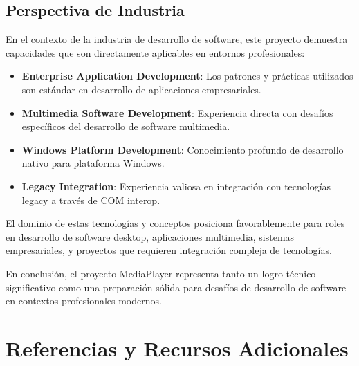 \documentclass[a4paper]{article}
\begin{document}
\subsection{Perspectiva de Industria}

En el contexto de la industria de desarrollo de software, este proyecto demuestra capacidades que son directamente aplicables en entornos profesionales:

\begin{itemize}
\item \textbf{Enterprise Application Development}: Los patrones y prácticas utilizados son estándar en desarrollo de aplicaciones empresariales.

\item \textbf{Multimedia Software Development}: Experiencia directa con desafíos específicos del desarrollo de software multimedia.

\item \textbf{Windows Platform Development}: Conocimiento profundo de desarrollo nativo para plataforma Windows.

\item \textbf{Legacy Integration}: Experiencia valiosa en integración con tecnologías legacy a través de COM interop.
\end{itemize}

El dominio de estas tecnologías y conceptos posiciona favorablemente para roles en desarrollo de software desktop, aplicaciones multimedia, sistemas empresariales, y proyectos que requieren integración compleja de tecnologías.

En conclusión, el proyecto MediaPlayer representa tanto un logro técnico significativo como una preparación sólida para desafíos de desarrollo de software en contextos profesionales modernos.

\section{Referencias y Recursos Adicionales}
\end{document}
